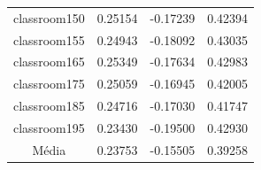 \documentclass[cic,tc]{iiufrgs}
\begin{document}
\begin{table}[h]
\begin{tabular}{c|c|c|c}
          classroom150 & 0.25154 & -0.17239 & 0.42394 \\
          classroom155 & 0.24943 & -0.18092 & 0.43035 \\
          classroom165 & 0.25349 & -0.17634 & 0.42983 \\
          classroom175 & 0.25059 & -0.16945 & 0.42005 \\
          classroom185 & 0.24716 & -0.17030 & 0.41747 \\
          classroom195 & 0.23430 & -0.19500 & 0.42930 \\
          \hline
          \hline
          Média        & 0.23753 & -0.15505 & 0.39258 \\
          \hline
        \end{tabular}
    \label{tbl:results1}
\end{table}
\end{document}
